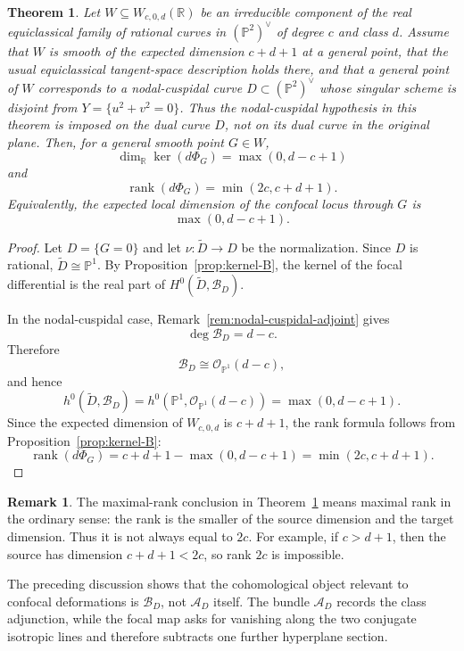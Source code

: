 \documentclass[11pt]{amsart}
\newtheorem{thm}[lemma]{Theorem}
\theoremstyle{definition}
\newtheorem{remark}[lemma]{Remark}
\theoremstyle{remark}
\newcommand{\bR}{\mathbb{R}}
\newcommand{\bP}{\mathbb{P}}
\newcommand{\A}{\mathcal{A}}
\newcommand{\B}{\mathcal{B}}
\begin{document}
\begin{thm}\label{thm:rational-rank}
Let $W\subseteq W_{c,0,d}(\bR)$ be an irreducible component of the real equiclassical family of rational curves in $(\bP^2)^\vee$ of degree $c$ and class $d$. Assume that $W$ is smooth of the expected dimension $c+d+1$ at a general point, that the usual equiclassical tangent-space description holds there, and that a general point of $W$ corresponds to a nodal-cuspidal curve $D\subset(\mathbb P^2)^\vee$ whose singular scheme is disjoint from $Y=\{u^2+v^2=0\}$. Thus the nodal-cuspidal hypothesis in this theorem is imposed on the dual curve $D$, not on its dual curve in the original plane. Then, for a general smooth point $G\in W$,
\[
\dim_{\bR}\ker(d\Phi_G)=\max(0,d-c+1)
\]
and
\[
\operatorname{rank}(d\Phi_G)=\min(2c,c+d+1).
\]
Equivalently, the expected local dimension of the confocal locus through $G$ is
\[
\max(0,d-c+1).
\]
\end{thm}

\begin{proof}
Let $D=\{G=0\}$ and let $\nu:\widetilde D\to D$ be the normalization. Since $D$ is rational, $\widetilde D\cong \mathbb P^1$. By Proposition~\ref{prop:kernel-B}, the kernel of the focal differential is the real part of $H^0(\widetilde D,\B_D)$.

In the nodal-cuspidal case, Remark~\ref{rem:nodal-cuspidal-adjoint} gives
\[
\deg \B_D=d-c.
\]
Therefore
\[
\B_D\cong \mathcal O_{\mathbb P^1}(d-c),
\]
and hence
\[
h^0(\widetilde D,\B_D)=h^0(\mathbb P^1,\mathcal O_{\mathbb P^1}(d-c))=
\max(0,d-c+1).
\]
Since the expected dimension of $W_{c,0,d}$ is $c+d+1$, the rank formula follows from Proposition~\ref{prop:kernel-B}:
\[
\operatorname{rank}(d\Phi_G)
=c+d+1-\max(0,d-c+1)
=\min(2c,c+d+1).
\]
\end{proof}

\begin{remark}\label{rem:rational-correction}
The maximal-rank conclusion in Theorem~\ref{thm:rational-rank} means maximal rank in the ordinary sense: the rank is the smaller of the source dimension and the target dimension. Thus it is not always equal to $2c$. For example, if $c>d+1$, then the source has dimension $c+d+1<2c$, so rank $2c$ is impossible.
\end{remark}

The preceding discussion shows that the cohomological object relevant to confocal deformations is $\B_D$, not $\A_D$ itself. The bundle $\A_D$ records the class adjunction, while the focal map asks for vanishing along the two conjugate isotropic lines and therefore subtracts one further hyperplane section.
\end{document}
